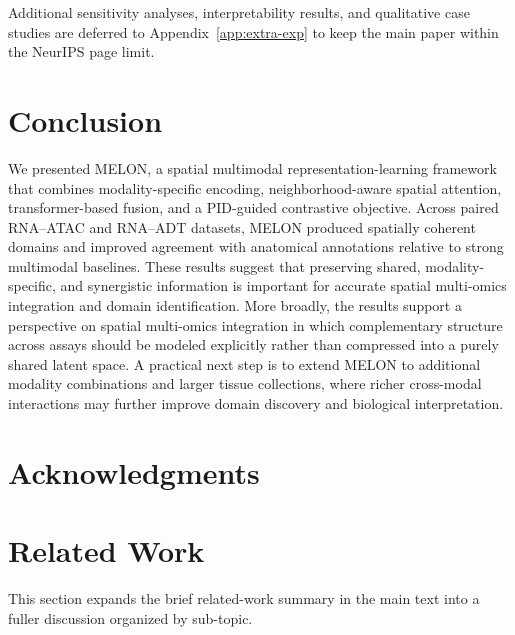 \documentclass{article}
\theoremstyle{plain}
\theoremstyle{definition}
\newcommand{\melon}{MELON}
\begin{document}
Additional sensitivity analyses, interpretability results, and qualitative case studies are deferred to Appendix~\ref{app:extra-exp} to keep the main paper within the NeurIPS page limit.

\section{Conclusion}
We presented \melon{}, a spatial multimodal representation-learning framework that combines modality-specific encoding, neighborhood-aware spatial attention, transformer-based fusion, and a PID-guided contrastive objective. Across paired RNA--ATAC and RNA--ADT datasets, MELON produced spatially coherent domains and improved agreement with anatomical annotations relative to strong multimodal baselines. These results suggest that preserving shared, modality-specific, and synergistic information is important for accurate spatial multi-omics integration and domain identification. More broadly, the results support a perspective on spatial multi-omics integration in which complementary structure across assays should be modeled explicitly rather than compressed into a purely shared latent space. A practical next step is to extend MELON to additional modality combinations and larger tissue collections, where richer cross-modal interactions may further improve domain discovery and biological interpretation.

\section*{Acknowledgments}




\newpage
\appendix
\onecolumn

\section{Related Work}\label{app:related_work}

This section expands the brief related-work summary in the main text into a fuller discussion organized by sub-topic.
\end{document}
